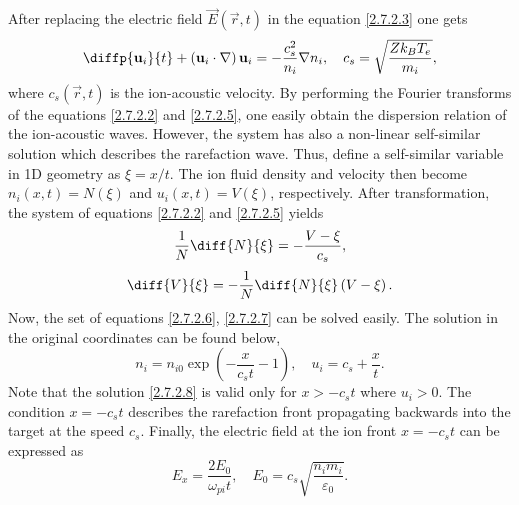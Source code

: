 After replacing the electric field $ \vec{E} \left(\vec{r}, t\right) $ in the equation \ref{2.7.2.3} one gets
\begin{equation}
\label{2.7.2.5}
\diffp{\vec{u}_i}{t} + \left(\vec{u}_i \cdot \grad{} \right) \vec{u}_i = - \frac{c_s^2}{n_i} \grad{n_i}, \quad c_s = \sqrt{\frac{Z k_B T_e}{m_i}},
\end{equation}
where $ c_s \left(\vec{r}, t\right) $ is the ion-acoustic velocity. By performing the Fourier transforms of the equations \ref{2.7.2.2} and \ref{2.7.2.5}, one easily obtain the dispersion relation of the ion-acoustic waves. However, the system has also a non-linear self-similar solution which describes the rarefaction wave. Thus, define a self-similar variable in 1D geometry as $ \xi = x/t $. The ion fluid density and velocity then become $ n_i \left(x, t\right) = N \left( \xi \right) $ and $ u_i \left(x, t\right) = V \left( \xi \right) $, respectively. After transformation, the system of equations \ref{2.7.2.2} and \ref{2.7.2.5} yields
\begin{equation}
\label{2.7.2.6}
\frac{1}{N} \diff{N}{\xi} = - \frac{V - \xi}{c_s},
\end{equation}
\begin{equation}
\label{2.7.2.7}
\diff{V}{\xi} = - \frac{1}{N} \diff{N}{\xi} \left(V - \xi \right).
\end{equation}
Now, the set of equations \ref{2.7.2.6}, \ref{2.7.2.7} can be solved easily. The solution in the original coordinates can be found below,
\begin{equation}
\label{2.7.2.8}
n_i = n_{i0} \exp \left( -\frac{x}{c_s t} - 1 \right), \quad u_i = c_s + \frac{x}{t}.
\end{equation}
Note that the solution \ref{2.7.2.8} is valid only for $ x > -c_s t $ where $ u_i > 0 $. The condition $ x = - c_s t $ describes the rarefaction front propagating backwards into the target at the speed $ c_s $. Finally, the electric field at the ion front $ x = - c_s t $ can be expressed as
\begin{equation}
\label{2.7.2.9}
E_x = \frac{2 E_0}{\omega_{pi} t}, \quad E_0 = c_s \sqrt{\frac{n_i m_i}{\varepsilon_0}}.
\end{equation}


